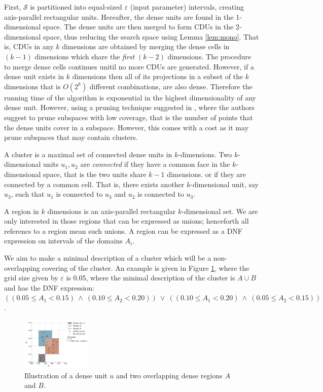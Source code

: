 First, $\mathcal{S}$ is partitioned into equal-sized $\varepsilon$ (input parameter) intervals, creating axis-parallel rectangular units. Hereafter, the dense units are found in the 1-dimensional space. The dense units are then merged to form CDUs in the 2-dimensional space, thus reducing the search space using Lemma \ref{lem:mono}. That is, CDUs in any $k$ dimensions are obtained by merging the dense cells in $(k-1)$ dimensions which share the \textit{first} $(k-2)$ dimensions. The procedure to merge dense cells continues unitil no more CDUs are generated. However, if a dense unit exists in $k$ dimensions then all of its projections in a subset of the $k$ dimensions that is $O(2^k)$ different combinations, are also dense. Therefore the running time of the algorithm is exponential in the highest dimensionality of any dense unit. However, using a pruning technique suggested in \cite{clique}, where the authors suggest to prune subspaces with low coverage, that is the number of points that the dense units cover in a subspace. However, this comes with a cost as it may prune subspaces that may contain clusters.

A cluster is a maximal set of connected dense units in $k$-dimensions. Two $k$-dimensional units $u_1, u_2$ are \textit{connected} if they have a common face in the $k$-dimensional space, that is the two units share $k-1$ dimensions. or if they are connected by a common cell. That is, there exists another $k$-dimensional unit, say $u_3$, such that $u_1$ is connected to $u_3$ and $u_2$ is connected to $u_3$.

A region in $k$ dimensions is an axis-parallel rectangular $k$-dimensional set. We are only interested in those regions that can be expressed as unions; henceforth all referencs to a region mean such unions. A region can be expressed as a DNF expression on intervals of the domains $A_i$.

We aim to make a minimal description of a cluster which will be a non-overlapping covering of the cluster. An example is given in Figure \ref{fig:dense_cells_and_regions}, where the grid size given by $\varepsilon$ is 0.05, where the minimal description of the cluster is $A \cup B$ and has the DNF expression: $((0.05 \le A_1 < 0.15) ~\wedge~ (0.10 \le A_2 < 0.20)) ~\vee~ ((0.10 \le A_1 < 0.20) ~\wedge~ (0.05 \le A_2 < 0.15))$.
\begin{figure}[H]
    \vspace*{-0.5cm}
    \centering
    \includegraphics[width=0.3\textwidth]{figures/dense_cells_and_regions.png}
    \caption{Illustration of a dense unit $u$ and two overlapping dense regions $A$ and $B$.}
    \label{fig:dense_cells_and_regions}
    \vspace*{-0.5cm}
\end{figure}

